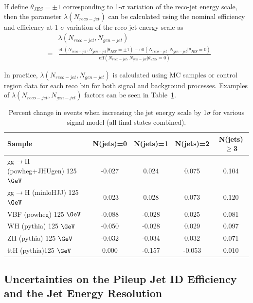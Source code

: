 If define $\theta_{JES}=\pm 1$ corresponding to 1-$\sigma$ variation of the reco-jet energy scale, then the parameter $\lambda(N_{reco-jet})$ can be
calculated using the nominal efficiency and efficiency at 1-$\sigma$ variation of the reco-jet energy scale as
\begin{eqnarray}
&&\lambda(N_{reco-jet}, N_{gen-jet} )\nonumber\\
&=& \frac{\mathrm{eff}(N_{reco-jet}, N_{gen-jet} | \theta_{JES}=\pm 1)-\mathrm{eff}(N_{reco-jet}, N_{gen-jet} | \theta_{JES}=0)}{\mathrm{eff}(N_{reco-jet}, N_{gen-jet} | \theta_{JES}=0)}
\end{eqnarray}

In practice, $\lambda(N_{reco-jet}, N_{gen-jet})$ is calculated using MC samples or control region data for each reco bin for both signal and background
processes. Examples of  $\lambda(N_{reco-jet}, N_{gen-jet})$ factors can be seen in Table~\ref{tab:jesSM}.
\begin{table}[!h!tb]
\begin{center}
\small
\caption{
Percent change in events when increasing the jet energy scale by 1$\sigma$ for various signal model (all final states combined).
\label{tab:jesSM}
}
\begin{tabular}{|l|c|c|c|c|} \hline
Sample & N(jets)=0 & N(jets)=1 & N(jets)=2 & N(jets)$\geq$3 \\ \hline
gg$\rightarrow$H ({\sc powheg+JHUgen}) 125 $\GeV$ & -0.027 & 0.024 & 0.075 & 0.104 \\
gg$\rightarrow$H ({\sc minloHJJ}) 125 $\GeV$ & -0.023 & 0.028 & 0.073 & 0.120 \\
VBF ({\sc powheg}) 125 $\GeV$ & -0.088 & -0.028 & 0.025 & 0.081 \\
WH ({\sc pythia}) 125 $\GeV$ & -0.050 & -0.028 & 0.029 & 0.097 \\
ZH ({\sc pythia}) 125 $\GeV$ & -0.032 & -0.034 & 0.032 & 0.071 \\
ttH ({\sc pythia})125 $\GeV$ & 0.000 & -0.157 & -0.053 & 0.010 \\
\hline
\end{tabular}
\normalsize
\end{center}
\end{table}
 \subsection{Uncertainties on the Pileup Jet ID Efficiency and the Jet Energy Resolution}

